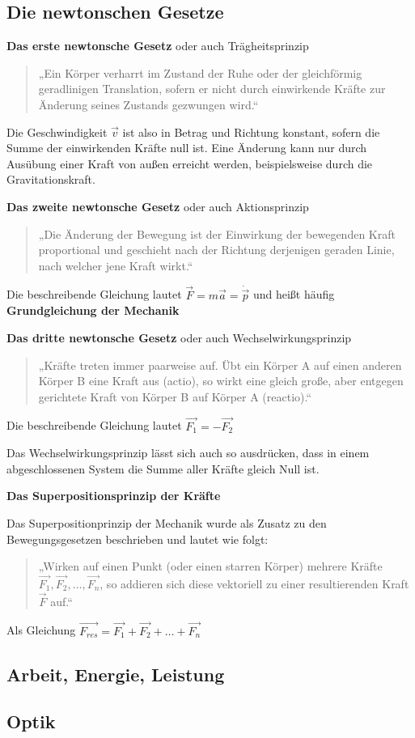 \documentclass[../document.tex]{subfiles}
\begin{document}
\subsection{Die newtonschen Gesetze}


\textbf{Das erste newtonsche Gesetz} oder auch Trägheitsprinzip

\begin{quote}
„Ein Körper verharrt im Zustand der Ruhe oder der gleichförmig geradlinigen Translation, sofern er nicht durch einwirkende Kräfte zur Änderung seines Zustands gezwungen wird.“
\end{quote}

Die Geschwindigkeit $\vec{v}$ ist also in Betrag und Richtung konstant, sofern die Summe der einwirkenden Kräfte null ist. Eine Änderung kann nur durch Ausübung einer Kraft von außen erreicht werden, beispielsweise durch die Gravitationskraft.


\textbf{Das zweite newtonsche Gesetz} oder auch Aktionsprinzip

\begin{quote}
„Die Änderung der Bewegung ist der Einwirkung der bewegenden Kraft proportional und geschieht nach der Richtung derjenigen geraden Linie, nach welcher jene Kraft wirkt.“
\end{quote}

Die beschreibende Gleichung lautet $\vec{F} = m\vec{a} = \dot{\vec{p}}$ und heißt häufig \textbf{Grundgleichung der Mechanik} 


\textbf{Das dritte newtonsche Gesetz} oder auch Wechselwirkungsprinzip

\begin{quote}
„Kräfte treten immer paarweise auf. Übt ein Körper A auf einen anderen Körper B eine Kraft aus (actio), so wirkt eine gleich große, aber entgegen gerichtete Kraft von Körper B auf Körper A (reactio).“
\end{quote}

Die beschreibende Gleichung lautet $\vec{F_1} = -\vec{F_2}$ 

Das Wechselwirkungsprinzip lässt sich auch so ausdrücken, dass in einem abgeschlossenen System die Summe aller Kräfte gleich Null ist.

\textbf{Das Superpositionsprinzip der Kräfte}

Das Superpositionprinzip der Mechanik wurde als Zusatz zu den Bewegungsgesetzen beschrieben und lautet wie folgt:

\begin{quote}
„Wirken auf einen Punkt (oder einen starren Körper) mehrere Kräfte ${\vec  {F_{1}}},{\vec  {F_{2}}},\dots,{\vec  {F_{n}}}$, so addieren sich diese vektoriell zu einer resultierenden Kraft ${\vec {F}}$ auf.“
\end{quote}

Als Gleichung $\vec{F_{{res}}}=\vec  {F_{1}}+\vec  {F_{2}}+\dots+\vec  {F_{n}}$


\subsection{Arbeit, Energie, Leistung}











\subsection{Optik}
\end{document}
